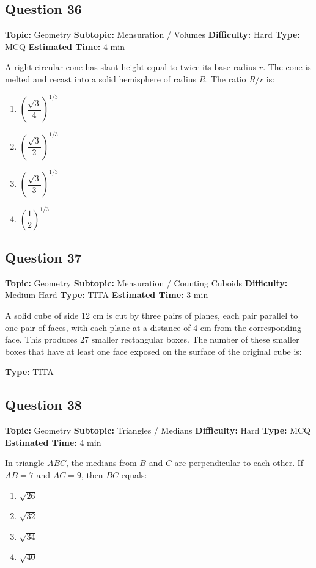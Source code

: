 \documentclass[11pt]{article}
\begin{document}
\subsection*{Question 36}
\textbf{Topic:} Geometry \quad \textbf{Subtopic:} Mensuration / Volumes \quad \textbf{Difficulty:} Hard \quad \textbf{Type:} MCQ \quad \textbf{Estimated Time:} 4 min

\begin{tcolorbox}
A right circular cone has slant height equal to twice its base radius $r$. The cone is melted and recast into a solid hemisphere of radius $R$. The ratio $R/r$ is:
\end{tcolorbox}
\begin{enumerate}[label=(\Alph*)]
\item $\left(\dfrac{\sqrt{3}}{4}\right)^{1/3}$
\item $\left(\dfrac{\sqrt{3}}{2}\right)^{1/3}$
\item $\left(\dfrac{\sqrt{3}}{3}\right)^{1/3}$
\item $\left(\dfrac{1}{2}\right)^{1/3}$
\end{enumerate}

\subsection*{Question 37}
\textbf{Topic:} Geometry \quad \textbf{Subtopic:} Mensuration / Counting Cuboids \quad \textbf{Difficulty:} Medium-Hard \quad \textbf{Type:} TITA \quad \textbf{Estimated Time:} 3 min

\begin{tcolorbox}
A solid cube of side 12 cm is cut by three pairs of planes, each pair parallel to one pair of faces, with each plane at a distance of 4 cm from the corresponding face. This produces 27 smaller rectangular boxes. The number of these smaller boxes that have at least one face exposed on the surface of the original cube is:
\end{tcolorbox}
\textbf{Type:} TITA

\subsection*{Question 38}
\textbf{Topic:} Geometry \quad \textbf{Subtopic:} Triangles / Medians \quad \textbf{Difficulty:} Hard \quad \textbf{Type:} MCQ \quad \textbf{Estimated Time:} 4 min

\begin{tcolorbox}
In triangle $ABC$, the medians from $B$ and $C$ are perpendicular to each other. If $AB = 7$ and $AC = 9$, then $BC$ equals:
\end{tcolorbox}
\begin{enumerate}[label=(\Alph*)]
\item $\sqrt{26}$
\item $\sqrt{32}$
\item $\sqrt{34}$
\item $\sqrt{40}$
\end{enumerate}
\end{document}
